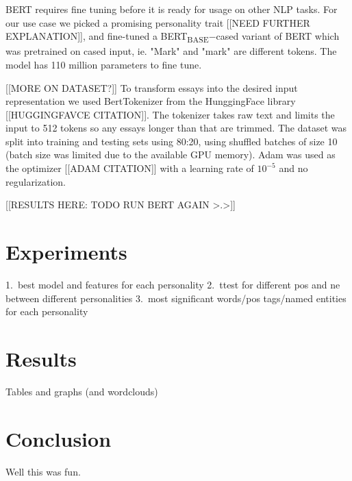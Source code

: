 \documentclass[10pt, a4paper]{article}
\begin{document}
BERT requires fine tuning before it is ready for usage on other NLP tasks. For our use case we picked a promising personality trait [[NEED FURTHER EXPLANATION]], and fine-tuned a BERT\textsubscript{BASE}$-$cased variant of BERT which was pretrained on cased input, ie. "Mark" and "mark" are different tokens. The model has 110 million parameters to fine tune.

[[MORE ON DATASET?]] To transform essays into the desired input representation we used BertTokenizer from the HunggingFace library [[HUGGINGFAVCE CITATION]]. The tokenizer takes raw text and limits the input to 512 tokens so any essays longer than that are trimmed. The dataset was split into training and testing sets using 80:20, using shuffled batches of size 10 (batch size was limited due to the available GPU memory). Adam was used as the optimizer [[ADAM CITATION]] with a learning rate of $10^{-5}$ and no regularization.

[[RESULTS HERE: TODO RUN BERT AGAIN >.>]]

\section{Experiments}
1.\ best model and features for each personality
2.\ ttest for different pos and ne between different personalities
3.\ most significant words/pos tags/named entities for each personality

\section{Results}
Tables and graphs (and wordclouds)

\section{Conclusion}
Well this was fun.



\end{document}
